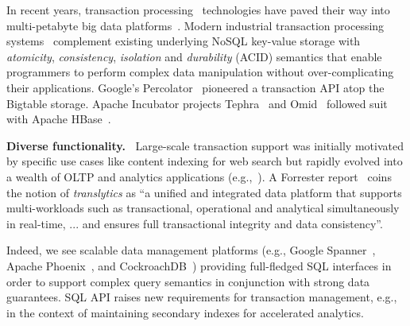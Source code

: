 In recent years, transaction processing~\cite{Gray:1992:TPC:573304} technologies have paved their way into multi-petabyte big data platforms~\cite{Percolator2010,Spanner2012,Omid2017}. 
Modern industrial transaction processing systems~\cite{Percolator2010, Omid2017, tephra, cockroach} complement 
existing underlying NoSQL key-value storage with {\em atomicity}, {\em consistency}, {\em isolation\/} and {\em durability} (ACID) semantics that enable programmers to perform complex data manipulation without over-complicating their applications. Google's Percolator~\cite{Percolator2010} pioneered a transaction API atop the Bigtable storage. Apache 
Incubator projects Tephra~\cite{tephra} and Omid~\cite{Omid2017} followed suit with Apache HBase~\cite{hbase}. 

{}

{\bf Diverse functionality.\ }
Large-scale transaction support was initially motivated by specific use cases like content indexing for 
web search\cite{Percolator2010, Omid2017} but  rapidly evolved into a wealth of OLTP and  analytics 
applications (e.g.,~\cite{F1-2013}). {}
A Forrester report~\cite{Forrester2017} coins the notion of {\em translytics}  as ``a unified and integrated data platform that supports multi-workloads such as transactional, operational and analytical simultaneously in real-time, ... and ensures full transactional integrity and data consistency''. 

{} Indeed, we see scalable data management platforms (e.g., Google Spanner~\cite{Spanner2012}, Apache Phoenix~\cite{phoenix}, and CockroachDB~\cite{cockroach}) providing full-fledged SQL interfaces in order to support complex query semantics in conjunction with strong data guarantees. SQL API raises new requirements for transaction management, e.g., in the context of maintaining secondary indexes for accelerated analytics. 

